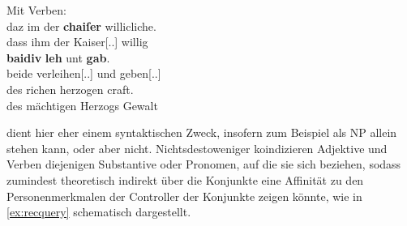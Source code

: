 \begin{exe}
\begin{xlist}
	\ex \label{ex:konjvb}
		Mit Verben:\\
		\gll daz im der \textbf{chaiſer} willicliche. \\
			dass ihm der Kaiser[\Nom.\Sg.\MascM] willig \\
	\sn	\gll \textbf{baidiv} \textbf{leh} unt \textbf{gab}. \\
			beide verleihen[\Tsg\subM.\Ind.\Pst] und
			geben[\Tsg\subM.\Ind.\Pst] \\
	\sn	\gll des richen herzogen craft. \\
			des mächtigen Herzogs Gewalt \\
		\begin{taggedline}{\parencites[\pno~73\ra, 19--21]{kc:A1}[vgl.][17108--17110]{schroeder1895}}
		\trans {}
		\end{taggedline}
	\end{xlist}
\end{exe}

 dient hier eher einem syntaktischen Zweck, insofern zum
Beispiel   als NP allein stehen kann,
  oder
  aber nicht.
Nichtsdestoweniger koindizieren Adjektive und Verben diejenigen Substantive
oder Pronomen, auf die sie sich beziehen, sodass  zumindest
theoretisch indirekt über die Konjunkte eine Affinität zu den Personenmerkmalen
der Controller der Konjunkte zeigen könnte, wie in \cref{ex:recquery}
schematisch dargestellt.

